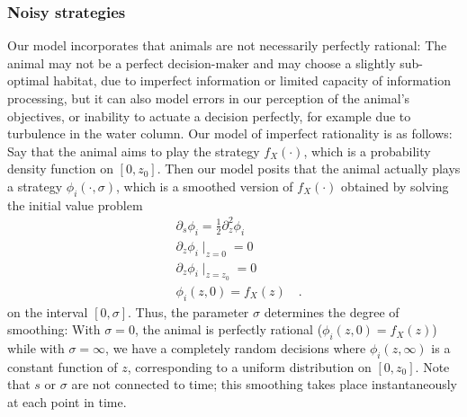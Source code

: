 





\subsubsection*{Noisy strategies}
Our model incorporates that animals are not necessarily perfectly rational: The animal may not be a perfect decision-maker and may choose a slightly sub-optimal habitat, due to imperfect information or limited capacity of information processing, but it can also model errors in our perception of the animal's objectives, or inability to actuate a decision perfectly, for example due to turbulence in the water column. Our model of imperfect rationality is as follows: Say that the animal aims to play the strategy $f_X(\cdot)$, which is a probability density function on $[0,z_0]$. Then our model posits that the animal actually plays a strategy $\phi_i(\cdot ,\sigma)$, which is a smoothed version of $f_X(\cdot)$ obtained by solving the initial value problem
\begin{align}
  \label{eq:density_PDE}
  &\partial_s \phi_i = \frac{1}{2}\partial_z^2 \phi_i \\
  &\partial_z \phi_i \mid_{z=0} = 0 \\
  &\partial_z \phi_i \mid_{z = z_0} = 0 \\
  & \phi_i(z,0) = f_X(z) \quad .
\end{align}
on the interval $[0,\sigma]$. Thus, the parameter $\sigma$ determines the degree of smoothing: With $\sigma=0$, the animal is perfectly rational ($\phi_i(z,0)=f_X(z)$) while with $\sigma=\infty$, we have a completely random decisions where $\phi_i(z,\infty)$ is a constant function of $z$, corresponding to a uniform distribution on $[0,z_0]$. Note that $s$ or $\sigma$ are not connected to time; this smoothing takes place instantaneously at each point in time.

